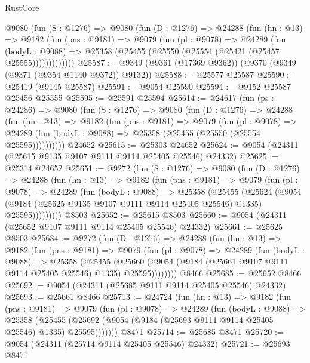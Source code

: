 \begin{lexlean}{RustCore}
\begin{coremodule}
      @9080
        (fun (S : @1276) =>
        @9080
          (fun (D : @1276) =>
          @24288
            (fun (hn : @13) =>
            @9182
              (fun (pns : @9181) =>
              @9079
                (fun (pl : @9078) =>
                @24289
                  (fun (bodyL : @9088) =>
                  @25358 (@25455 (@25550 (@25554 (@25421 (@25457 @25555)))))))))))))
@25587 := @9349 (@9361 (@17369 @9362)) (@9370 (@9349 (@9371 (@9354 @1140 @9372)) @9132))
@25588 := @25577 @25587
@25590 := @25419 (@9145 @25587)
@25591 := @9054 @25590
@25594 := @9152 @25587 @25456 @25555
@25595 := @25591 @25594
@25614 := @24617
    (fun (ps : @24286) =>
    @9080
      (fun (S : @1276) =>
      @9080
        (fun (D : @1276) =>
        @24288
          (fun (hn : @13) =>
          @9182
            (fun (pns : @9181) =>
            @9079
              (fun (pl : @9078) =>
              @24289 (fun (bodyL : @9088) => @25358 (@25455 (@25550 (@25554 @25595))))))))))
    @24652
@25615 := @25303 @24652
@25624 := @9054 (@24311 (@25615 @9135 @9107 @9111 @9114 @25405 @25546) @24332)
@25625 := @25314 @24652
@25651 := @9272
    (fun (S : @1276) =>
    @9080
      (fun (D : @1276) =>
      @24288
        (fun (hn : @13) =>
        @9182
          (fun (pns : @9181) =>
          @9079
            (fun (pl : @9078) =>
            @24289
              (fun (bodyL : @9088) =>
              @25358
                (@25455
                  (@25624
                    (@9054
                      (@9184 (@25625 @9135 @9107 @9111 @9114 @25405 @25546) @1335)
                      @25595)))))))))
    @8503
@25652 := @25615 @8503
@25660 := @9054 (@24311 (@25652 @9107 @9111 @9114 @25405 @25546) @24332)
@25661 := @25625 @8503
@25684 := @9272
    (fun (D : @1276) =>
    @24288
      (fun (hn : @13) =>
      @9182
        (fun (pns : @9181) =>
        @9079
          (fun (pl : @9078) =>
          @24289
            (fun (bodyL : @9088) =>
            @25358
              (@25455
                (@25660 (@9054 (@9184 (@25661 @9107 @9111 @9114 @25405 @25546) @1335) @25595))))))))
    @8466
@25685 := @25652 @8466
@25692 := @9054 (@24311 (@25685 @9111 @9114 @25405 @25546) @24332)
@25693 := @25661 @8466
@25713 := @24724
    (fun (hn : @13) =>
    @9182
      (fun (pns : @9181) =>
      @9079
        (fun (pl : @9078) =>
        @24289
          (fun (bodyL : @9088) =>
          @25358
            (@25455 (@25692 (@9054 (@9184 (@25693 @9111 @9114 @25405 @25546) @1335) @25595)))))))
    @8471
@25714 := @25685 @8471
@25720 := @9054 (@24311 (@25714 @9114 @25405 @25546) @24332)
@25721 := @25693 @8471

\end{coremodule}
\end{lexlean}
